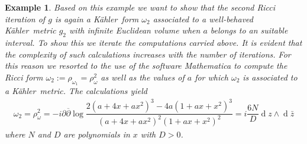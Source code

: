 \documentclass[12pt]{amsart}
\newcommand{\de}{\partial}
\newcommand{\K}{K\"{a}hler}
\newcommand{\ov}[1]{\overline{#1}}
\newcommand{\deb}{\ov\partial}
\newcommand{\di}{{\operatorname{d}}}
\newtheorem{ex}{Example}
\begin{document}
\begin{ex}
	Based on this example we want to show that the second Ricci iteration of $g$ is again a \K\ form $\omega_2$ associated to a well-behaved \K\ metric $g_2$ with infinite Euclidean volume when $a$ belongs to an suitable interval.
	To show this we iterate the computations carried above. 
	It is evident that the complexity of such calculations increases with the number of iterations. 
	For this reason we resorted to the use of the software Mathematica \cite{Mathematica} to compute the Ricci form $\omega_2:=\rho_{\omega_1}=\rho^2_\omega$ as well as the values of $a$ for which $\omega_2$ is associated to a \K\ metric.
	The calculations yield
	\begin{align}\label{EqMetricWB2Explicit}
		\nonumber	\omega_2=\rho^2_\omega=-i\de\deb\log\dfrac{2(a+4x+ax^2)^3-4a(1+ax+x^2)^3}{(a+4x+ax^2)^2(1+ax+x^2)^2}=i\dfrac{6N}{D}\di z\wedge\di\bar{z}
	\end{align}
	where $N$ and $D$ are polynomials in $x$ with $D>0$. 

\end{ex}
\end{document}
